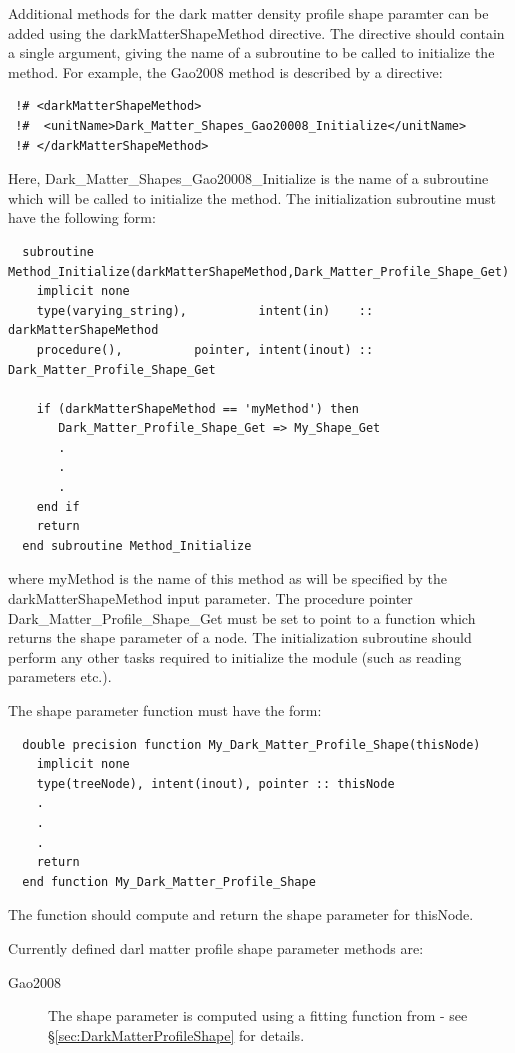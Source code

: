 Additional methods for the dark matter density profile shape paramter can be added using the {\normalfont \ttfamily darkMatterShapeMethod} directive. The directive should contain a single argument, giving the name of a subroutine to be called to initialize the method. For example, the {\normalfont \ttfamily Gao2008} method is described by a directive:
\begin{verbatim}
 !# <darkMatterShapeMethod>
 !#  <unitName>Dark_Matter_Shapes_Gao20008_Initialize</unitName>
 !# </darkMatterShapeMethod>
\end{verbatim}
Here, {\normalfont \ttfamily Dark\_Matter\_Shapes\_Gao20008\_Initialize} is the name of a subroutine which will be called to initialize the method. The initialization subroutine must have the following form:
\begin{verbatim}
  subroutine Method_Initialize(darkMatterShapeMethod,Dark_Matter_Profile_Shape_Get)
    implicit none
    type(varying_string),          intent(in)    :: darkMatterShapeMethod
    procedure(),          pointer, intent(inout) :: Dark_Matter_Profile_Shape_Get
    
    if (darkMatterShapeMethod == 'myMethod') then
       Dark_Matter_Profile_Shape_Get => My_Shape_Get
       .
       .
       .
    end if
    return
  end subroutine Method_Initialize
\end{verbatim}
where {\normalfont \ttfamily myMethod} is the name of this method as will be specified by the {\normalfont \ttfamily darkMatterShapeMethod} input parameter. The procedure pointer {\normalfont \ttfamily Dark\_Matter\_Profile\_Shape\_Get} must be set to point to a function which returns the shape parameter of a node. The initialization subroutine should perform any other tasks required to initialize the module (such as reading parameters etc.).

The shape parameter function must have the form:
\begin{verbatim}
  double precision function My_Dark_Matter_Profile_Shape(thisNode)
    implicit none
    type(treeNode), intent(inout), pointer :: thisNode
    .
    .
    .
    return
  end function My_Dark_Matter_Profile_Shape
\end{verbatim}
The function should compute and return the shape parameter for {\normalfont \ttfamily thisNode}.

Currently defined darl matter profile shape parameter methods are:
\begin{description}
 \item [{\normalfont \ttfamily Gao2008}] The shape parameter is computed using a fitting function from \cite{gao_redshift_2008} - see \S\ref{sec:DarkMatterProfileShape} for details.
\end{description}

